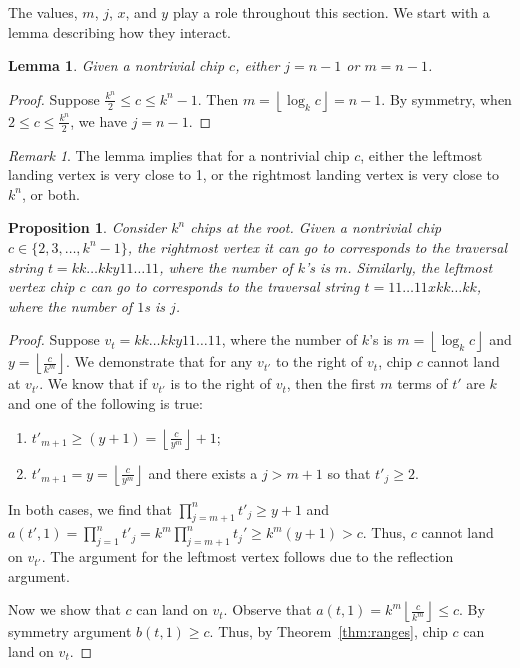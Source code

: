 \documentclass[11pt]{article}
\newtheorem{lemma}[theorem]{Lemma} %
\newtheorem{proposition}[theorem]{Proposition}
\theoremstyle{definition}
\theoremstyle{remark}
\newtheorem*{remark}{Remark} %
\newcommand{\floor}[1]{\left\lfloor #1 \right\rfloor}
\begin{document}
The values, $m$, $j$, $x$, and $y$ play a role throughout this section. We start with a lemma describing how they interact.

\begin{lemma}
\label{lem:nontrivialchip}
    Given a nontrivial chip $c$, either $j=n-1$ or $m=n-1$.
\end{lemma}

\begin{proof}    
    Suppose $\frac{k^n}{2} \leq c \leq k^n-1$. Then $m = \floor{\log_k c} = n-1$. By symmetry, when $2 \leq c \leq \frac{k^n}{2}$, we have $j = n-1$.
\end{proof}

\begin{remark}
The lemma implies that for a nontrivial chip $c$, either the leftmost landing vertex is very close to 1, or the rightmost landing vertex is very close to $k^n$, or both.
\end{remark}

\begin{proposition}\label{prop:LeftRightmostVertex}
Consider $k^n$ chips at the root. Given a nontrivial chip $c \in \{2, 3, \dots, k^n-1\}$, the rightmost vertex it can go to corresponds to the traversal string $t = kk\dots kky11\dots 11$, where the number of $k$'s is $m$. Similarly, the leftmost vertex chip $c$ can go to corresponds to the traversal string $t = 11\dots 11xkk\dots kk$, where the number of $1$s is $j$.
\end{proposition}

\begin{proof}
Suppose $v_t = kk\dots kky11\dots 11$, where the number of $k$'s is $m = \floor{\log_k c}$ and $y = \floor{\frac{c}{k^m}}$. We demonstrate that for any $v_{t'}$ to the right of $v_t$, chip $c$ cannot land at $v_{t'}$. We know that if $v_{t'}$ is to the right of $v_t$, then the first $m$ terms of $t'$ are $k$ and one of the following is true:
\begin{enumerate}
    \item $t'_{m+1} \geq (y+1) = \floor{\frac{c}{y^m}}+1$;
    \item $t'_{m+1}=y= \floor{\frac{c}{y^m}}$ and there exists a $j > m+1$ so that $t'_{j} \geq 2$.
\end{enumerate}
In both cases, we find that $\prod_{j=m+1}^nt'_j \geq y+1$ and $a(t', 1)  = \prod_{j=1}^nt'_j = k^m \prod_{j=m+1}^nt_j' \geq k^m(y+1) > c$. Thus, $c$ cannot land on $v_{t'}$. The argument for the leftmost vertex follows due to the reflection argument.

Now we show that $c$ can land on $v_t$. Observe that $a(t, 1)  = k^m \floor{\frac{c}{k^m}} \leq c$. By symmetry argument $b(t, 1) \geq c$. Thus, by Theorem~\ref{thm:ranges}, chip $c$ can land on $v_t$.
\end{proof}
\end{document}
